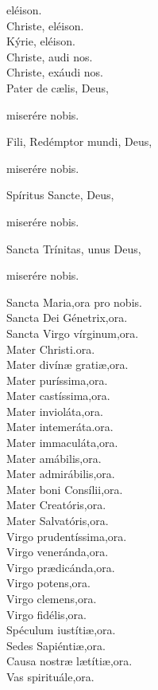 eléison.\\
Christe, eléison.\\
Kýrie, eléison.\\
Christe, audi nos.\\
Christe, exáudi nos.\\
Pater de c{\ae}lis, Deus,

\hfill miserére nobis.

Fili, Redémptor mundi, Deus,

\hfill miserére nobis.

Spíritus Sancte, Deus,

\hfill miserére nobis.

Sancta Trínitas, unus Deus,

\hfill miserére nobis.

Sancta Maria,\hfill ora pro nobis.\\
Sancta Dei Génetrix,\hfill ora.\\
Sancta Virgo vírginum,\hfill ora.\\
Mater Christi.\hfill ora.\\
Mater divín{\ae} grati{\ae},\hfill ora.\\
Mater puríssima,\hfill ora.\\
Mater castíssima,\hfill ora.\\
Mater invioláta,\hfill ora.\\
Mater intemeráta.\hfill ora.\\
Mater immaculáta,\hfill ora.\\
Mater amábilis,\hfill ora.\\
Mater admirábilis,\hfill ora.\\
Mater boni Consílii,\hfill ora.\\
Mater Creatóris,\hfill ora.\\
Mater Salvatóris,\hfill ora.\\
Virgo prudentíssima,\hfill ora.\\
Virgo veneránda,\hfill ora.\\
Virgo pr{\ae}dicánda,\hfill ora.\\
Virgo potens,\hfill ora.\\
Virgo clemens,\hfill ora.\\
Virgo fidélis,\hfill ora.\\
Spéculum iustíti{\ae},\hfill ora.\\
Sedes Sapiénti{\ae},\hfill ora.\\
Causa nostr{\ae} l{\ae}títi{\ae},\hfill ora.\\
Vas spirituále,\hfill ora.\\
